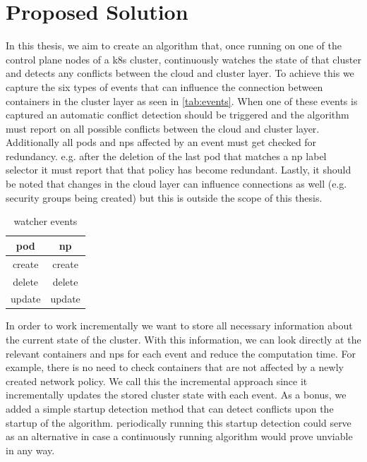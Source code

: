 \chapter{Proposed Solution}                                 \label{ch:solution}

In this thesis, we aim to create an algorithm that, once running on one of the control plane nodes of a \acrshort{k8s} cluster, continuously watches the state of that cluster and detects any conflicts between the cloud and cluster layer. To achieve this we capture the six types of events that can influence the connection between containers in the cluster layer as seen in \autoref{tab:events}. When one of these events is captured an automatic conflict detection should be triggered and the algorithm must report on all possible conflicts between the cloud and cluster layer. Additionally all pods and \acrshort{np}s affected by an event must get checked for redundancy. e.g. after the deletion of the last pod that matches a \acrshort{np} label selector it must report that that policy has become redundant. Lastly, it should be noted that changes in the cloud layer can influence connections as well (e.g. security groups being created) but this is outside the scope of this thesis.
\\[10pt]
\begin{table}[htbp]
  \centering
  \begin{tabular}{|c|c|}
    \hline
    pod & \acrshort{np} \\
    \hline
    create & create \\
    delete & delete \\
    update & update \\
    \hline
  \end{tabular}
  \caption{watcher events}
  \label{tab:events}

\end{table}

In order to work incrementally we want to store all necessary information about the current state of the cluster. With this information, we can look directly at the relevant containers and \acrshort{np}s for each event and reduce the computation time. For example, there is no need to check containers that are not affected by a newly created network policy. We call this the incremental approach since it incrementally updates the stored cluster state with each event. As a bonus, we added a simple startup detection method that can detect conflicts upon the startup of the algorithm. periodically running this startup detection could serve as an alternative in case a continuously running algorithm would prove unviable in any way.  
\\[10pt]

